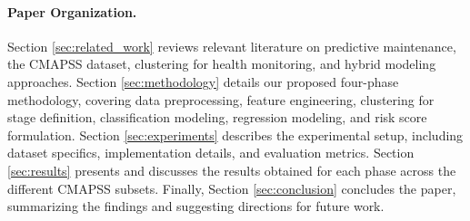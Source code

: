 \paragraph{Paper Organization.}
Section \ref{sec:related_work} reviews relevant literature on predictive maintenance, the CMAPSS dataset, clustering for health monitoring, and hybrid modeling approaches. Section \ref{sec:methodology} details our proposed four-phase methodology, covering data preprocessing, feature engineering, clustering for stage definition, classification modeling, regression modeling, and risk score formulation. Section \ref{sec:experiments} describes the experimental setup, including dataset specifics, implementation details, and evaluation metrics. Section \ref{sec:results} presents and discusses the results obtained for each phase across the different CMAPSS subsets. Finally, Section \ref{sec:conclusion} concludes the paper, summarizing the findings and suggesting directions for future work.
